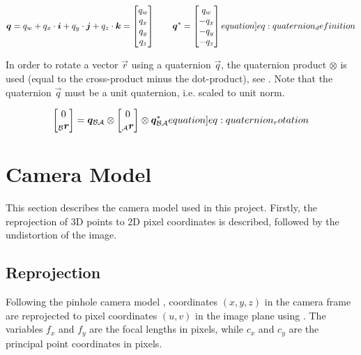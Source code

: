 \begin{equation}
    \vec q = q_w + q_x\cdot \vec i + q_y\cdot \vec j + q_z\cdot \vec k = \begin{bmatrix} q_w \\ q_x \\ q_y \\ q_z \end{bmatrix} \qquad
    \vec q^* = \begin{bmatrix} q_w \\ -q_x \\ -q_y \\ -q_z \end{bmatrix}
    \label[equation]{eq:quaternion_definition}
\end{equation}

In order to rotate a vector $\vec r$ using a quaternion $\vec q$, the quaternion product $\otimes$ is used (equal to the cross-product minus the dot-product), see . Note that the quaternion $\vec q$ must be a unit quaternion, i.e. scaled to unit norm.

\begin{equation}
    \begin{bmatrix} 0 \\ _\mathcal B \vec r \end{bmatrix} = \vec q_{\mathcal B \mathcal A} \otimes \begin{bmatrix} 0 \\ _\mathcal A \vec r \end{bmatrix} \otimes \vec q_{\mathcal B \mathcal A}^*
    \label[equation]{eq:quaternion_rotation}
\end{equation}

\section{Camera Model}
\label{sec:camera_model}

This section describes the camera model used in this project. Firstly, the reprojection of 3D points to 2D pixel coordinates is described, followed by the undistortion of the image.

\subsection{Reprojection}
\label{subsec:reprojection}

Following the pinhole camera model \cite{dawson1994simple}, coordinates $(x,y,z)$ in the camera frame are reprojected to pixel coordinates $(u,v)$ in the image plane using . The variables $f_x$ and $f_y$ are the focal lengths in pixels, while $c_x$ and $c_y$ are the principal point coordinates in pixels.

